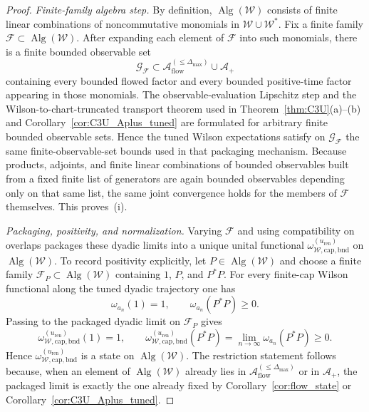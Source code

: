 \begin{proof}
\emph{Finite-family algebra step.}
By definition, $\operatorname{Alg}(\mathcal W)$ consists of finite linear combinations of noncommutative monomials in $\mathcal W\cup \mathcal W^\ast$.
Fix a finite family $\mathcal F\subset \operatorname{Alg}(\mathcal W)$.
After expanding each element of $\mathcal F$ into such monomials, there is a finite bounded observable set
\[
\mathcal G_{\mathcal F}\subset
\mathcal A_{\mathrm{flow}}^{(\le \Delta_{\max})}\cup \mathcal A_+
\]
containing every bounded flowed factor and every bounded positive-time factor appearing in those monomials.
The observable-evaluation Lipschitz step and the Wilson-to-chart-truncated transport theorem used in Theorem~\ref{thm:C3U}(a)--(b) and Corollary~\ref{cor:C3U_Aplus_tuned} are formulated for arbitrary finite bounded observable sets.
Hence the tuned Wilson expectations satisfy on $\mathcal G_{\mathcal F}$ the same finite-observable-set bounds used in that packaging mechanism.
Because products, adjoints, and finite linear combinations of bounded observables built from a fixed finite list of generators are again bounded observables depending only on that same list, the same joint convergence holds for the members of $\mathcal F$ themselves.
This proves~(i).

\emph{Packaging, positivity, and normalization.}
Varying $\mathcal F$ and using compatibility on overlaps packages these dyadic limits into a unique unital functional
$\omega_{\mathcal W,\mathrm{cap,bnd}}^{(u_{\mathrm{ren}})}$ on $\operatorname{Alg}(\mathcal W)$.
To record positivity explicitly, let $P\in \operatorname{Alg}(\mathcal W)$ and choose a finite family $\mathcal F_P\subset \operatorname{Alg}(\mathcal W)$ containing $1$, $P$, and $P^\ast P$.
For every finite-cap Wilson functional along the tuned dyadic trajectory one has
\[
\omega_{a_n}(1)=1,
\qquad
\omega_{a_n}(P^\ast P)\ge 0.
\]
Passing to the packaged dyadic limit on $\mathcal F_P$ gives
\[
\omega_{\mathcal W,\mathrm{cap,bnd}}^{(u_{\mathrm{ren}})}(1)=1,
\qquad
\omega_{\mathcal W,\mathrm{cap,bnd}}^{(u_{\mathrm{ren}})}(P^\ast P)
=
\lim_{n\to\infty}\omega_{a_n}(P^\ast P)
\ge 0.
\]
Hence $\omega_{\mathcal W,\mathrm{cap,bnd}}^{(u_{\mathrm{ren}})}$ is a state on $\operatorname{Alg}(\mathcal W)$.
The restriction statement follows because, when an element of $\operatorname{Alg}(\mathcal W)$ already lies in $\mathcal A_{\mathrm{flow}}^{(\le \Delta_{\max})}$ or in $\mathcal A_+$, the packaged limit is exactly the one already fixed by Corollary~\ref{cor:flow_state} or Corollary~\ref{cor:C3U_Aplus_tuned}.


\end{proof}
